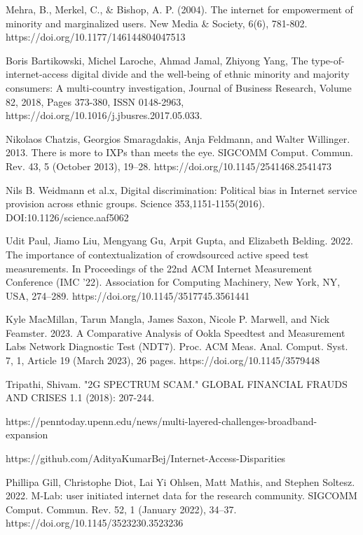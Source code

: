 \documentclass[conference]{IEEEtran}
\begin{document}
\begin{thebibliography}{00}


 Mehra, B., Merkel, C., & Bishop, A. P. (2004). The internet for empowerment of minority and marginalized users. New Media & Society, 6(6), 781-802. https://doi.org/10.1177/146144804047513

 Boris Bartikowski, Michel Laroche, Ahmad Jamal, Zhiyong Yang,
The type-of-internet-access digital divide and the well-being of ethnic minority and majority consumers: A multi-country investigation, Journal of Business Research, Volume 82, 2018, Pages 373-380, ISSN 0148-2963,
https://doi.org/10.1016/j.jbusres.2017.05.033.

 Nikolaos Chatzis, Georgios Smaragdakis, Anja Feldmann, and Walter Willinger. 2013. There is more to IXPs than meets the eye. SIGCOMM Comput. Commun. Rev. 43, 5 (October 2013), 19–28. https://doi.org/10.1145/2541468.2541473

 Nils B. Weidmann et al.x, Digital discrimination: Political bias in Internet service provision across ethnic groups. Science 353,1151-1155(2016). DOI:10.1126/science.aaf5062

 Udit Paul, Jiamo Liu, Mengyang Gu, Arpit Gupta, and Elizabeth Belding. 2022. The importance of contextualization of crowdsourced active speed test measurements. In Proceedings of the 22nd ACM Internet Measurement Conference (IMC '22). Association for Computing Machinery, New York, NY, USA, 274–289. https://doi.org/10.1145/3517745.3561441

 Kyle MacMillan, Tarun Mangla, James Saxon, Nicole P. Marwell, and Nick Feamster. 2023. A Comparative Analysis of Ookla Speedtest and Measurement Labs Network Diagnostic Test (NDT7). Proc. ACM Meas. Anal. Comput. Syst. 7, 1, Article 19 (March 2023), 26 pages. https://doi.org/10.1145/3579448

 Tripathi, Shivam. "2G SPECTRUM SCAM." GLOBAL FINANCIAL FRAUDS AND CRISES 1.1 (2018): 207-244.

 https://penntoday.upenn.edu/news/multi-layered-challenges-broadband-expansion

 https://github.com/AdityaKumarBej/Internet-Access-Disparities

 Phillipa Gill, Christophe Diot, Lai Yi Ohlsen, Matt Mathis, and Stephen Soltesz. 2022. M-Lab: user initiated internet data for the research community. SIGCOMM Comput. Commun. Rev. 52, 1 (January 2022), 34–37. https://doi.org/10.1145/3523230.3523236


\end{thebibliography}
\end{document}
